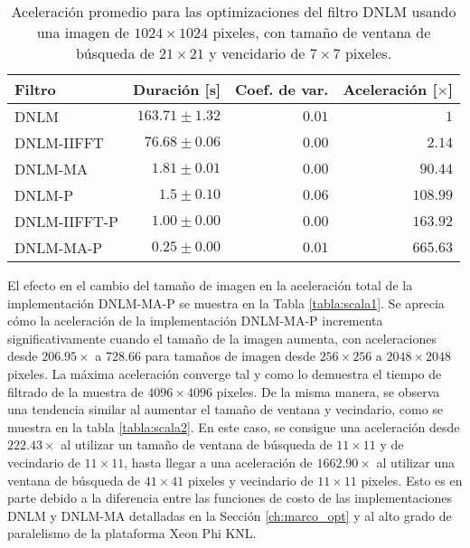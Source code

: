 \begin{table}
\protect\caption[Aceleración promedio de optimizaciones del filtro DNLM]{Aceleración promedio para las optimizaciones del filtro DNLM usando una imagen de  $1024 \times 1024$ pixeles, con tama\~no de ventana de búsqueda de $21 \times 21$ y vencidario de $7 \times 7$ pixeles. \label{tabla:speedup}}
\centering
\begin{tabular}{lrrr}
Filtro & Duración [s]& Coef. de var. & Aceleración [$\times$]\tabularnewline
\hline
DNLM & $163.71\pm1.32$ & $0.01$ & $1$\tabularnewline
DNLM-IIFFT & $76.68\pm0.06$ & $0.00$ & $2.14$\tabularnewline
DNLM-MA & $1.81\pm 0.01$ & $0.00$ & $90.44$ \tabularnewline
DNLM-P & $1.5\pm0.10$ & $0.06$ & $108.99$\tabularnewline
DNLM-IIFFT-P & $1.00\pm0.00$ & $0.00$ & $163.92$ \tabularnewline 
DNLM-MA-P & $\boldsymbol{0.25\pm0.00}$ & $\boldsymbol{0.01}$ &  $\boldsymbol{665.63}$\tabularnewline
\end{tabular}
\end{table}


El efecto en el cambio del tama\~no de imagen en la aceleración total de la implementación DNLM-MA-P se muestra en la Tabla \ref{tabla:scala1}. Se aprecia cómo la aceleración de la implementación DNLM-MA-P incrementa significativamente cuando el tama\~no de la imagen aumenta, con aceleraciones desde $206.95\times$ a $728.66$ para tama\~nos de imagen desde $256 \times 256$ a $2048 \times 2048$ pixeles. La máxima aceleración converge tal y como lo demuestra el tiempo de filtrado de la muestra de $4096\times 4096$ pixeles.  
De la misma manera, se observa una tendencia similar al aumentar el tama\~no de ventana y vecindario, como se muestra en la tabla \ref{tabla:scala2}. En este caso, se consigue una aceleración desde $222.43\times$ al utilizar un tama\~no de ventana de búsqueda de $11 \times 11$ y de vecindario de $11 \times 11$, hasta llegar a una aceleración de $1662.90\times$ al utilizar una ventana de búsqueda de $41 \times 41$ pixeles y vecindario de $11 \times 11$ pixeles. Esto es en parte debido a la diferencia entre las funciones de costo de las implementaciones DNLM y DNLM-MA detalladas en la Sección \ref{ch:marco_opt} y al alto grado de paralelismo de la plataforma Xeon Phi KNL.


